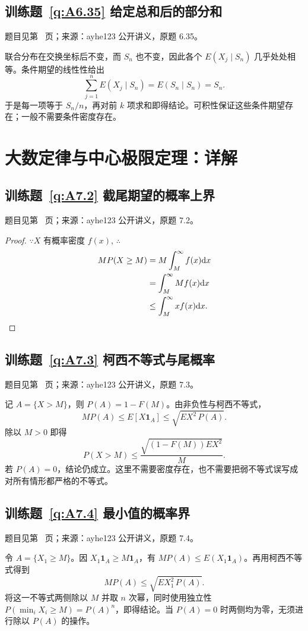 \documentclass[UTF8,12pt,a4paper,fontset=fandol]{ctexbook}
\begin{document}
\subsection*{训练题~\ref{q:A6.35} 给定总和后的部分和}\label{a:A6.35}{\small 题目见第~\pageref{q:A6.35} 页；来源：ayhe123 公开讲义，原题 6.35。}
\begin{solve}联合分布在交换坐标后不变，而 $S_n$ 也不变，因此各个 $E(X_j\mid S_n)$ 几乎处处相等。条件期望的线性性给出\[\sum_{j=1}^nE(X_j\mid S_n)=E(S_n\mid S_n)=S_n.\]于是每一项等于 $S_n/n$，再对前 $k$ 项求和即得结论。可积性保证这些条件期望存在；一般不需要条件密度存在。\end{solve}

\clearpage\section*{大数定律与中心极限定理：详解}

\subsection*{训练题~\ref{q:A7.2} 截尾期望的概率上界}\label{a:A7.2}{\small 题目见第~\pageref{q:A7.2} 页；来源：ayhe123 公开讲义，原题 7.2。}
\begin{proof}
    $\because X$ 有概率密度 $f(x)$, $\therefore$
    \begin{align*}
        MP(X\geq M) & =M\int_M^\infty f(x)\mathrm{d}x \\
        & =\int_M^\infty Mf(x)\mathrm{d}x \\
        & \leq\int_M^\infty xf(x)\mathrm{d}x.\qedhere
    \end{align*}
\end{proof}

\subsection*{训练题~\ref{q:A7.3} 柯西不等式与尾概率}\label{a:A7.3}{\small 题目见第~\pageref{q:A7.3} 页；来源：ayhe123 公开讲义，原题 7.3。}
\begin{solve}记 $A=\{X>M\}$，则 $P(A)=1-F(M)$。由非负性与柯西不等式，\[MP(A)\le E[X\mathbf1_A]\le\sqrt{EX^2\,P(A)}.\]除以 $M>0$ 即得\[P(X>M)\le\frac{\sqrt{(1-F(M))EX^2}}M.\]若 $P(A)=0$，结论仍成立。这里不需要密度存在，也不需要把弱不等式误写成对所有情形都严格的不等式。\end{solve}

\subsection*{训练题~\ref{q:A7.4} 最小值的概率界}\label{a:A7.4}{\small 题目见第~\pageref{q:A7.4} 页；来源：ayhe123 公开讲义，原题 7.4。}
\begin{solve}令 $A=\{X_1\ge M\}$。因 $X_1\mathbf1_A\ge M\mathbf1_A$，有 $MP(A)\le E(X_1\mathbf1_A)$。再用柯西不等式得到\[MP(A)\le\sqrt{EX_1^2\,P(A)}.\]将这一不等式两侧除以 $M$ 并取 $n$ 次幂，同时使用独立性 $P(\min_iX_i\ge M)=P(A)^n$，即得结论。当 $P(A)=0$ 时两侧均为零，无须进行除以 $P(A)$ 的操作。\end{solve}
\end{document}
